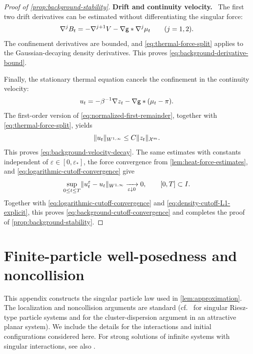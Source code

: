 \documentclass[11pt,reqno]{amsart}
\numberwithin{equation}{section}
\theoremstyle{plain}
\theoremstyle{remark}
\DeclarePairedDelimiter{\norm}{\lVert}{\rVert}
\newcommand{\parheading}[1]{\par\medskip\noindent\textbf{#1}\ }
\newcommand{\Xspace}{\mathcal X}
\begin{document}
\begin{proof}[Proof of \cref{prop:background-stability}]
\parheading{Drift and continuity velocity.}
The first two drift derivatives can be estimated without differentiating the singular force:
\begin{equation}\label{eq:background-drift-derivatives}
 \nabla^jB_t=-\nabla^{j+1}V-\nabla\mathsf g*\nabla^j\mu_t
 \qquad(j=1,2).
\end{equation}
The confinement derivatives are bounded, and \eqref{eq:thermal-force-split} applies to the Gaussian-decaying density derivatives. This proves \eqref{eq:background-derivative-bound}.

Finally, the stationary thermal equation cancels the confinement in the continuity velocity:
\begin{equation}\label{eq:velocity-from-log}
 u_t=-\beta^{-1}\nabla z_t-\nabla\mathsf g*(\mu_t-\pi).
\end{equation}
The first-order version of \eqref{eq:normalized-first-remainder}, together with \eqref{eq:thermal-force-split}, yields
\begin{equation}\label{eq:velocity-X-control}
 \norm{u_t}_{W^{1,\infty}}\le C\norm{z_t}_{\Xspace^m}.
\end{equation}
This proves \eqref{eq:background-velocity-decay}. The same estimates with constants independent of $\varepsilon\in[0,\varepsilon_*]$, the force convergence from \cref{lem:heat-force-estimates}, and \eqref{eq:logarithmic-cutoff-convergence} give
\begin{equation}\label{eq:velocity-cutoff-convergence-explicit}
 \sup_{0\le t\le T}\norm{u_t^\varepsilon-u_t}_{W^{1,\infty}}
 \xrightarrow[\varepsilon\downarrow0]{}0,
 \qquad[0,T]\subset I.
\end{equation} Together with \eqref{eq:logarithmic-cutoff-convergence} and \eqref{eq:density-cutoff-L1-explicit}, this proves \eqref{eq:background-cutoff-convergence} and completes the proof of \cref{prop:background-stability}.
\end{proof}

\par\endgroup

\begingroup

\section{Finite-particle well-posedness and noncollision}\label{app:particle-wp}

This appendix constructs the singular particle law used in \cref{lem:approximation}. The localization and noncollision arguments are standard (cf.\ \cite[\S4]{RSdiffusive} for singular Riesz-type particle systems and \cite[Lemma~15]{FournierJourdain2015} for the cluster-dispersion argument in an attractive planar system). We include the details for the interactions and initial configurations considered here. For strong solutions of infinite systems with singular interactions, see also \cite{OsadaTanemura2020}.
\end{document}
